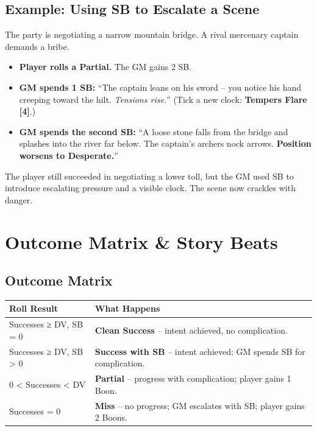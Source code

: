 \subsection{Example: Using SB to Escalate a Scene}
\label{subsec:bridge-sb-example}
\begin{tcolorbox}[colback=gray!5,colframe=gray!75!black,title={Spending SB for Drama (The Bridge)}]
The party is negotiating a narrow mountain bridge. A rival mercenary captain demands a bribe.

\begin{itemize}
  \item \textbf{Player rolls a Partial.} The GM gains 2 SB.
  \item \textbf{GM spends 1 SB:} “The captain leans on his sword – you notice his hand creeping toward the hilt. \emph{Tensions rise.}” (Tick a new clock: \textbf{Tempers Flare [4]}.)
  \item \textbf{GM spends the second SB:} “A loose stone falls from the bridge and splashes into the river far below. The captain’s archers nock arrows. \textbf{Position worsens to Desperate.}”
\end{itemize}
The player still succeeded in negotiating a lower toll, but the GM used SB to introduce escalating pressure and a visible clock. The scene now crackles with danger.
\end{tcolorbox}

\section{Outcome Matrix \& Story Beats}
\label{sec:outcome-sb}

\subsection{Outcome Matrix}
\begin{tcolorbox}[title=Outcome Matrix, colback=white!97!gray, colframe=black!80!gray]
\begin{tabularx}{\textwidth}{lX}
\toprule
\textbf{Roll Result} & \textbf{What Happens} \\
\midrule
Successes ≥ DV, SB = 0 & \textbf{Clean Success} – intent achieved, no complication. \\
Successes ≥ DV, SB > 0 & \textbf{Success with SB} – intent achieved; GM spends SB for complication. \\
0 < Successes < DV & \textbf{Partial} – progress with complication; player gains 1 Boon. \\
Successes = 0 & \textbf{Miss} – no progress; GM escalates with SB; player gains 2 Boons. \\
\bottomrule
\end{tabularx}
\end{tcolorbox}

